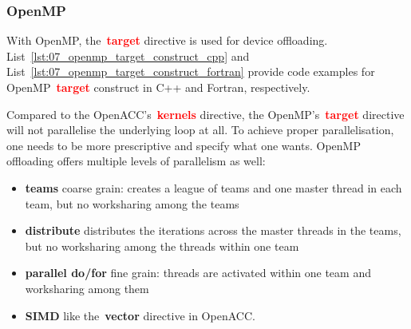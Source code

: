 \subsubsection{OpenMP}


\par
With OpenMP, the~\textbf{\textcolor{red}{target}} directive is used for device offloading.
List~\ref{lst:07_openmp_target_construct_cpp} and List~\ref{lst:07_openmp_target_construct_fortran} provide code examples for OpenMP~\textbf{\textcolor{red}{target}} construct in C++ and Fortran, respectively.








\par
Compared to the OpenACC’s~\textbf{\textcolor{red}{kernels}} directive, the OpenMP's~\textbf{\textcolor{red}{target}} directive will not parallelise the underlying loop at all.
To achieve proper parallelisation, one needs to be more prescriptive and specify what one wants.
OpenMP offloading offers multiple levels of parallelism as well:
\begin{itemize}
    \item \textbf{teams} coarse grain: creates a league of teams and one master thread in each team, but no worksharing among the teams
    \item \textbf{distribute} distributes the iterations across the master threads in the teams, but no worksharing among the threads within one team
    \item \textbf{parallel do/for} fine grain: threads are activated within one team and worksharing among them
    \item \textbf{SIMD} like the~\textbf{vector} directive in OpenACC.
\end{itemize}


